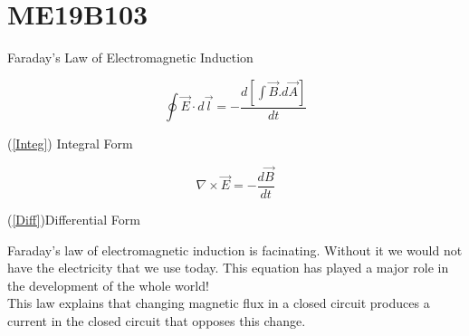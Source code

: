 \section{ME19B103}

\begin{center}
{\Large Faraday's Law of Electromagnetic Induction}  
\end{center}

\begin{equation}\label{Integ}
    \oint \overrightarrow{E}\cdot d\overrightarrow{\! l}=
    -\frac{d[\int\overrightarrow{B}.d\overrightarrow{A}]}{dt}
\end{equation}
\begin{center}
(\ref{Integ}) Integral Form
\end{center}

\begin{equation}\label{Diff}
    \nabla\times \overrightarrow{E} = -\frac{d\overrightarrow{B}}{dt} 
\end{equation}
\begin{center}
(\ref{Diff})Differential Form
\end{center}

Faraday's law of electromagnetic induction is facinating. Without it we would not have the electricity that we use today. This equation has played a major role in the development of the whole world!
\\ This law explains that changing magnetic flux in a closed circuit produces a current in the closed circuit that opposes this change. 


